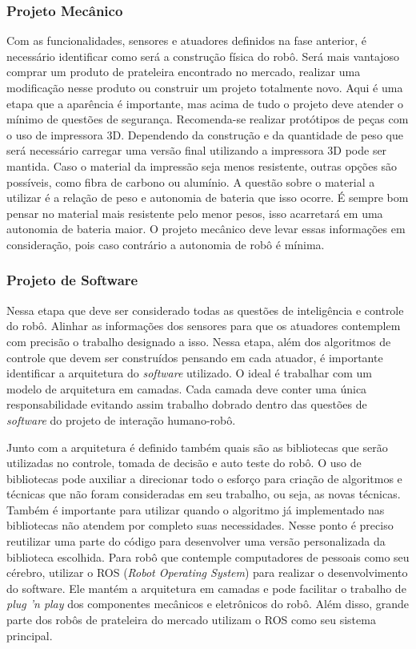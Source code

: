 \subsubsection{Projeto Mecânico}
\label{sec:mecanica}
Com as funcionalidades, sensores e atuadores definidos na fase anterior, é necessário identificar como será a construção física do robô. Será mais vantajoso comprar um produto de prateleira encontrado no mercado, realizar uma modificação nesse produto ou construir um projeto totalmente novo. Aqui é uma etapa que a aparência é importante, mas acima de tudo o projeto deve atender o mínimo de questões de segurança. Recomenda-se realizar protótipos de peças com o uso de impressora 3D. Dependendo da construção e da quantidade de peso que será necessário carregar uma versão final utilizando a impressora 3D pode ser mantida. Caso o material da impressão seja menos resistente, outras opções são possíveis, como fibra de carbono ou alumínio.  A questão sobre o material a utilizar é a relação de peso e autonomia de bateria que isso ocorre. É sempre bom pensar no material mais resistente pelo menor pesos, isso acarretará em uma autonomia de bateria maior. O projeto mecânico deve levar essas informações em consideração, pois caso contrário a autonomia de robô é mínima.

\subsubsection{Projeto de Software}
\label{sec:software}
Nessa etapa que deve ser considerado todas as questões de inteligência e controle do robô. Alinhar as informações dos sensores para que os atuadores contemplem com precisão o trabalho designado a isso. Nessa etapa, além dos algoritmos de controle que devem ser construídos pensando em cada atuador, é importante identificar a arquitetura do \textit{software} utilizado. O ideal é trabalhar com um modelo de arquitetura em camadas. Cada camada deve conter uma única responsabilidade evitando assim trabalho dobrado dentro das questões de \textit{software} do projeto de interação humano-robô.

Junto com a arquitetura é definido também quais são as bibliotecas que serão utilizadas no controle, tomada de decisão e auto teste do robô. O uso de bibliotecas pode auxiliar a direcionar todo o esforço para criação de algoritmos e técnicas que não foram consideradas em seu trabalho, ou seja, as novas técnicas. Também é importante para utilizar quando o algoritmo já implementado nas bibliotecas não atendem por completo suas necessidades. Nesse ponto é preciso reutilizar uma parte do código para desenvolver uma versão personalizada da biblioteca escolhida. Para robô que contemple computadores de pessoais como seu cérebro, utilizar o ROS (\textit{Robot Operating System}) para realizar o desenvolvimento do software. Ele mantém a arquitetura em camadas e pode facilitar o trabalho de \textit{plug 'n play} dos componentes mecânicos e eletrônicos do robô. Além disso, grande parte dos robôs de prateleira do mercado utilizam o ROS como seu sistema principal.

